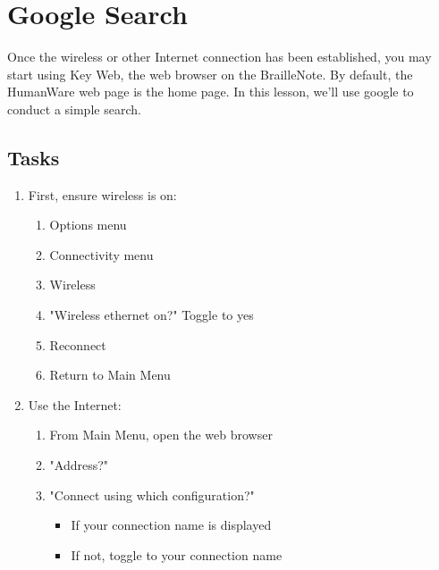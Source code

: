 \documentclass[10pt,letterpaper,twoside]{report}
\begin{document}
\section{Google Search}
Once the wireless or other Internet connection has been established, you may start using Key Web, the web browser on the BrailleNote. By default, the HumanWare web page is the home page. In this lesson, we'll use google to conduct a simple search.	
\subsection{Tasks}
\begin{enumerate}
	\item First, ensure wireless is on:
	      \begin{enumerate}
		      \item Options menu 
		      \item Connectivity menu 
		      \item Wireless 
		      \item "Wireless ethernet on?" Toggle to yes 
		      \item Reconnect 
		      \item Return to Main Menu 
	      \end{enumerate}
	\item Use the Internet:
	      \begin{enumerate}
		      \item From Main Menu, open the web browser 
		      \item "Address?" 
		      \item "Connect using which configuration?"
		            \begin{itemize}
			            \item If your connection name is displayed 
			            \item If not, toggle to your connection name 

\end{itemize}
\end{enumerate}
\end{enumerate}
\end{document}
